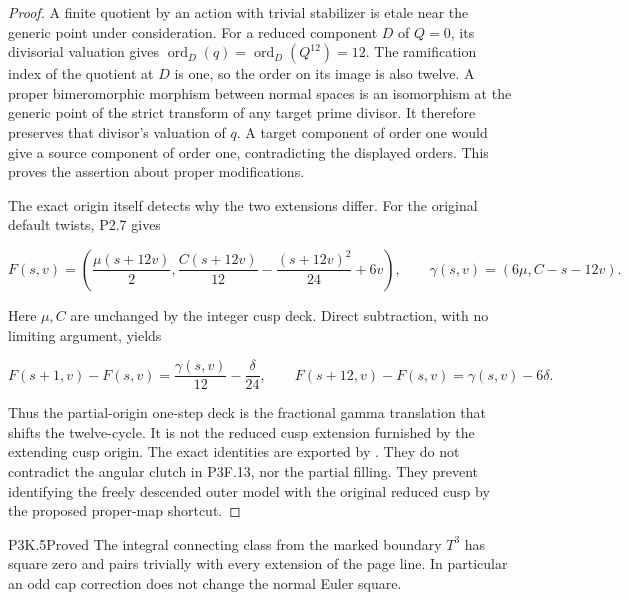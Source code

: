 \begin{proof}
A finite quotient by an action with trivial stabilizer is
etale near the generic point under consideration.  For a reduced
component \(D\) of \(Q=0\), its divisorial valuation gives
\(\operatorname{ord}_D(q)=\operatorname{ord}_D(Q^{12})=12\).
The ramification index of the quotient at \(D\) is one, so the order
on its image is also twelve.  A proper bimeromorphic morphism between
normal spaces is an isomorphism at the generic point of the strict
transform of any target prime divisor.  It therefore preserves that
divisor's valuation of \(q\).  A target component of order one would
give a source component of order one, contradicting the displayed
orders.  This proves the assertion about proper modifications.

The exact origin itself detects why the two extensions differ.
For the original default twists, P2.7 gives

\[
 F(s,v)=\left(\frac{\mu(s+12v)}2,
 \frac{C(s+12v)}{12}-\frac{(s+12v)^2}{24}+6v\right),
 \qquad \gamma(s,v)=(6\mu,C-s-12v).
\]

Here \(\mu,C\) are unchanged by the integer cusp deck.  Direct
subtraction, with no limiting argument, yields

\[
 F(s+1,v)-F(s,v)=\frac{\gamma(s,v)}{12}-\frac{\delta}{24},
 \qquad
 F(s+12,v)-F(s,v)=\gamma(s,v)-6\delta.
\]

Thus the partial-origin one-step deck is the fractional gamma
translation that shifts the twelve-cycle.  It is not the reduced
cusp extension furnished by the extending cusp origin.  The exact
identities are exported by .
They do not contradict the angular clutch in P3F.13, nor the partial
filling.  They prevent identifying the freely descended outer model
with the original reduced cusp by the proposed proper-map shortcut.
\end{proof}

\begin{statement}{P3K.5}{Proved}
The integral connecting class from the marked boundary \(T^3\) has square zero and pairs trivially with every extension of the page line.  In particular an odd cap correction does not change the normal Euler square.
\end{statement}

